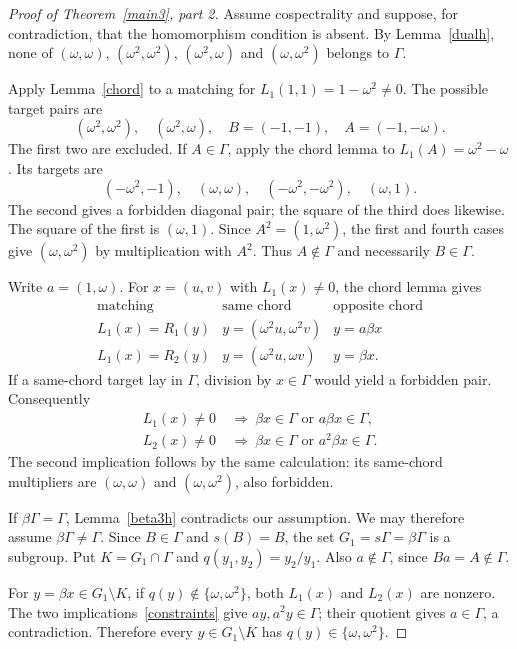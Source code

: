 \documentclass[11pt]{article}
\theoremstyle{remark}\newtheorem{remark}[theorem]{Remark}
\begin{document}
\begin{proof}[Proof of Theorem~\ref{main3}, part 2]
Assume cospectrality and suppose, for contradiction, that the homomorphism condition is absent. By Lemma~\ref{dualh}, none of $(\omega,\omega)$, $(\omega^2,\omega^2)$, $(\omega^2,\omega)$ and $(\omega,\omega^2)$ belongs to $\Gamma$.

Apply Lemma~\ref{chord} to a matching for $L_1(1,1)=1-\omega^2\ne0$. The possible target pairs are
\[
(\omega^2,\omega^2),\quad (\omega^2,\omega),\quad
B=(-1,-1),\quad A=(-1,-\omega).
\]
The first two are excluded. If $A\in\Gamma$, apply the chord lemma to $L_1(A)=\omega^2-\omega$. Its targets are
\[
(-\omega^2,-1),\quad (\omega,\omega),\quad
(-\omega^2,-\omega^2),\quad (\omega,1).
\]
The second gives a forbidden diagonal pair; the square of the third does likewise. The square of the first is $(\omega,1)$. Since $A^2=(1,\omega^2)$, the first and fourth cases give $(\omega,\omega^2)$ by multiplication with $A^2$. Thus $A\notin\Gamma$ and necessarily $B\in\Gamma$.

Write $a=(1,\omega)$. For $x=(u,v)$ with $L_1(x)\ne0$, the chord lemma gives
\[
\begin{array}{c|cc}
\text{matching}&\text{same chord}&\text{opposite chord}\\\hline
L_1(x)=R_1(y)&y=(\omega^2u,\omega^2v)&y=a\beta x\\
L_1(x)=R_2(y)&y=(\omega^2u,\omega v)&y=\beta x.
\end{array}
\]
If a same-chord target lay in $\Gamma$, division by $x\in\Gamma$ would yield a forbidden pair. Consequently
\begin{equation}\label{constraints}
\begin{split}
L_1(x)\ne0&\ \Longrightarrow\ \beta x\in\Gamma\text{ or }a\beta x\in\Gamma,\\
L_2(x)\ne0&\ \Longrightarrow\ \beta x\in\Gamma\text{ or }a^2\beta x\in\Gamma.
\end{split}
\end{equation}
The second implication follows by the same calculation: its same-chord multipliers are $(\omega,\omega)$ and $(\omega,\omega^2)$, also forbidden.

If $\beta\Gamma=\Gamma$, Lemma~\ref{beta3h} contradicts our assumption. We may therefore assume $\beta\Gamma\ne\Gamma$. Since $B\in\Gamma$ and $s(B)=B$, the set $G_1=s\Gamma=\beta\Gamma$ is a subgroup. Put $K=G_1\cap\Gamma$ and $q(y_1,y_2)=y_2/y_1$. Also $a\notin\Gamma$, since $Ba=A\notin\Gamma$.

For $y=\beta x\in G_1\setminus K$, if $q(y)\notin\{\omega,\omega^2\}$, both $L_1(x)$ and $L_2(x)$ are nonzero. The two implications~\eqref{constraints} give $ay,a^2y\in\Gamma$; their quotient gives $a\in\Gamma$, a contradiction. Therefore every $y\in G_1\setminus K$ has $q(y)\in\{\omega,\omega^2\}$.


\end{proof}
\end{document}
